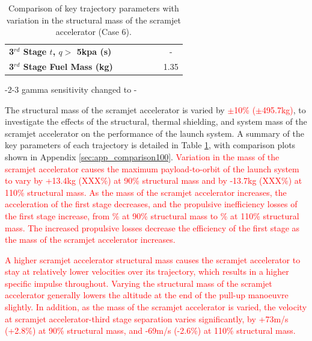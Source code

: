 \begin{table}[ht]
\begin{tabular}{l c c c c c c}
		\\
		\textbf{3$^{rd}$ Stage $t$, $q >$ 5kpa (s)}
		& \thirdqOverFivemSPARTANNinetyNoReturn
		& \thirdqOverFivemSPARTANNinetyFiveNoReturn
		& \thirdqOverFivemSPARTANStandardNoReturn
		& \thirdqOverFivemSPARTANOneHundredFiveNoReturn
		& \thirdqOverFivemSPARTANOneHundredTenNoReturn
		& -
		\\
		\textbf{3$^{rd}$ Stage Fuel Mass (kg)}
		& \thirdmFuelmSPARTANNinetyNoReturn
		& \thirdmFuelmSPARTANNinetyFiveNoReturn
		& \thirdmFuelmSPARTANStandardNoReturn
		& \thirdmFuelmSPARTANOneHundredFiveNoReturn
		& \thirdmFuelmSPARTANOneHundredTenNoReturn
		&1.35
		\\
		\hline 
	\end{tabular} 
\caption{Comparison of key trajectory parameters with variation in the structural mass of the scramjet accelerator (Case 6).}
\label{tab:comparison100}
	
\end{table}
-2-3 gamma sensitivity changed to -


The structural mass of the scramjet accelerator is varied by \textcolor{red}{$\pm$10\% ($\pm$495.7kg)}, to investigate the effects of the structural, thermal shielding, and system mass of the scramjet accelerator on the performance of the launch system. A summary of the key parameters of each trajectory is detailed in Table \ref{tab:comparison100}, with comparison plots shown in Appendix \ref{sec:app_comparison100}.
\textcolor{red}{Variation in the mass of the scramjet accelerator causes the maximum payload-to-orbit of the launch system to vary by +13.4kg (XXX\%) at 90\% structural mass and by -13.7kg (XXX\%) at 110\% structural mass. 
 As the mass of the scramjet accelerator increases, the acceleration of the first stage decreases, and the propulsive inefficiency losses of the first stage increase, from \PlossonemSPARTANNinetyNoReturn\% at 90\% structural mass to \PlossonemSPARTANOneHundredTenNoReturn\% at 110\% structural mass. The increased propulsive losses decrease the efficiency of the first stage as the mass of the scramjet accelerator increases.}

\textcolor{red}{
A higher scramjet accelerator structural mass causes the scramjet accelerator to stay at relatively lower velocities over its trajectory, which results in a higher specific impulse throughout. 
Varying the structural mass of the scramjet accelerator generally lowers the altitude at the end of the pull-up manoeuvre slightly. In addition, as the mass of the scramjet accelerator is varied, the velocity at scramjet accelerator-third stage separation varies significantly, by +73m/s (+2.8\%) at 90\% structural mass, and -69m/s (-2.6\%) at 110\% structural mass. }

